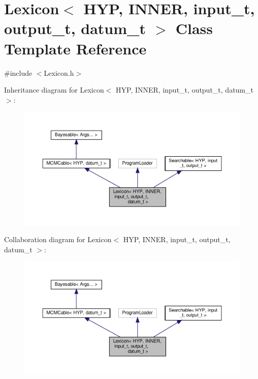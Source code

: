 \hypertarget{class_lexicon}{}\section{Lexicon$<$ H\+YP, I\+N\+N\+ER, input\+\_\+t, output\+\_\+t, datum\+\_\+t $>$ Class Template Reference}
\label{class_lexicon}


{\ttfamily \#include $<$Lexicon.\+h$>$}



Inheritance diagram for Lexicon$<$ H\+YP, I\+N\+N\+ER, input\+\_\+t, output\+\_\+t, datum\+\_\+t $>$\+:\nopagebreak
\begin{figure}[H]
\begin{center}
\leavevmode
\includegraphics[width=350pt]{class_lexicon__inherit__graph}
\end{center}
\end{figure}


Collaboration diagram for Lexicon$<$ H\+YP, I\+N\+N\+ER, input\+\_\+t, output\+\_\+t, datum\+\_\+t $>$\+:\nopagebreak
\begin{figure}[H]
\begin{center}
\leavevmode
\includegraphics[width=350pt]{class_lexicon__coll__graph}
\end{center}
\end{figure}
